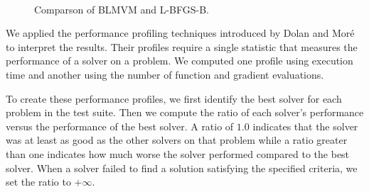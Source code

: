 \begin{figure}[ht]
\begin{center}
\caption{Comparson of BLMVM and L-BFGS-B.}
   \textwidth
    \\
\label{figure3}
\end{center}
\end{figure}

We applied the performance profiling techniques introduced by Dolan
and Mor\'e\cite{dolan2} to
interpret the results.
Their profiles require a single statistic that measures the performance
of a solver on a problem.  We computed one profile using execution time
and another using the number of function and gradient evaluations.

To create these performance profiles, we first identify the best solver
for each  problem in the test suite.  
Then we compute the ratio of each solver's performance
versus the performance of the best solver.  A ratio of $1.0$ indicates
that the solver was at least as good as the other solvers on that problem
while a ratio greater than one indicates how much worse the solver performed
compared to the best solver.  
When a solver failed to find a solution satisfying the 
specified criteria, we set the ratio to $+\infty$.

